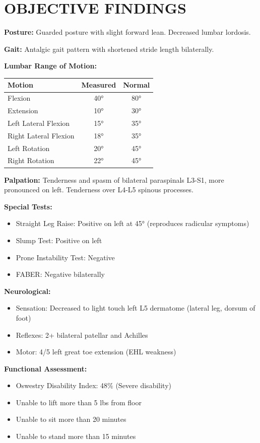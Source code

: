\documentclass[11pt]{article}
\begin{document}
\section*{OBJECTIVE FINDINGS}

\textbf{Posture:} Guarded posture with slight forward lean. Decreased lumbar lordosis.

\textbf{Gait:} Antalgic gait pattern with shortened stride length bilaterally.

\textbf{Lumbar Range of Motion:}
\begin{tabular}{@{}lcc@{}}
\toprule
\textbf{Motion} & \textbf{Measured} & \textbf{Normal} \\
\midrule
Flexion & 40° & 80° \\
Extension & 10° & 30° \\
Left Lateral Flexion & 15° & 35° \\
Right Lateral Flexion & 18° & 35° \\
Left Rotation & 20° & 45° \\
Right Rotation & 22° & 45° \\
\bottomrule
\end{tabular}

\textbf{Palpation:} Tenderness and spasm of bilateral paraspinals L3-S1, more pronounced on left. Tenderness over L4-L5 spinous processes.

\textbf{Special Tests:}
\begin{itemize}[nosep]
\item Straight Leg Raise: Positive on left at 45° (reproduces radicular symptoms)
\item Slump Test: Positive on left
\item Prone Instability Test: Negative
\item FABER: Negative bilaterally
\end{itemize}

\textbf{Neurological:}
\begin{itemize}[nosep]
\item Sensation: Decreased to light touch left L5 dermatome (lateral leg, dorsum of foot)
\item Reflexes: 2+ bilateral patellar and Achilles
\item Motor: 4/5 left great toe extension (EHL weakness)
\end{itemize}

\textbf{Functional Assessment:}
\begin{itemize}[nosep]
\item Oswestry Disability Index: 48\% (Severe disability)
\item Unable to lift more than 5 lbs from floor
\item Unable to sit more than 20 minutes
\item Unable to stand more than 15 minutes
\end{itemize}
\end{document}
